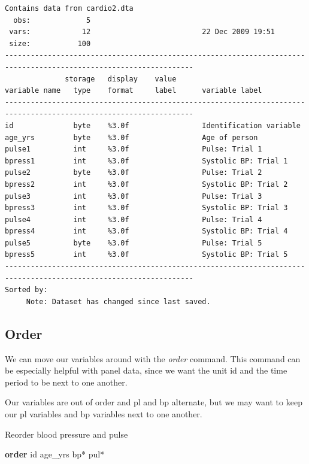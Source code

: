 \documentclass[
]{book}
\newenvironment{Shaded}{\begin{snugshade}}{\end{snugshade}}
\newcommand{\KeywordTok}[1]{\textcolor[rgb]{0.13,0.29,0.53}{\textbf{#1}}}
\newcommand{\NormalTok}[1]{#1}
\begin{document}
\begin{verbatim}
Contains data from cardio2.dta
  obs:             5                          
 vars:            12                          22 Dec 2009 19:51
 size:           100                          
------------------------------------------------------------------------------------------------------------------
              storage   display    value
variable name   type    format     label      variable label
------------------------------------------------------------------------------------------------------------------
id              byte    %3.0f                 Identification variable
age_yrs         byte    %3.0f                 Age of person
pulse1          int     %3.0f                 Pulse: Trial 1
bpress1         int     %3.0f                 Systolic BP: Trial 1
pulse2          byte    %3.0f                 Pulse: Trial 2
bpress2         int     %3.0f                 Systolic BP: Trial 2
pulse3          int     %3.0f                 Pulse: Trial 3
bpress3         int     %3.0f                 Systolic BP: Trial 3
pulse4          int     %3.0f                 Pulse: Trial 4
bpress4         int     %3.0f                 Systolic BP: Trial 4
pulse5          byte    %3.0f                 Pulse: Trial 5
bpress5         int     %3.0f                 Systolic BP: Trial 5
------------------------------------------------------------------------------------------------------------------
Sorted by: 
     Note: Dataset has changed since last saved.
\end{verbatim}

\subsection{Order}\label{order}

We can move our variables around with the \emph{order} command. This command can be especially helpful with panel data, since we want the unit id and the time period to be next to one another.

Our variables are out of order and pl and bp alternate, but we may want to keep our pl variables and bp variables next to one another.

Reorder blood pressure and pulse

\begin{Shaded}
\begin{Highlighting}[]
\KeywordTok{order}\NormalTok{ id age\_yrs bp* pul*}
\end{Highlighting}
\end{Shaded}
\end{document}
